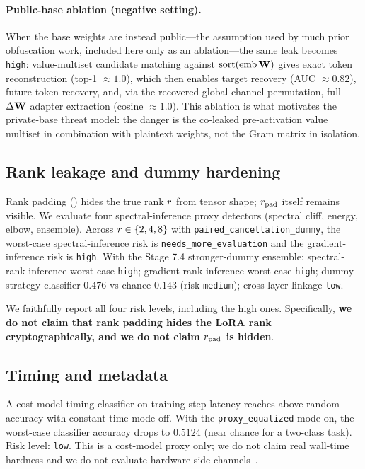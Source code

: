 \paragraph{Public-base ablation (negative setting).}
When the base weights are instead public---the assumption used by much prior obfuscation work, included here only as an ablation---the same leak becomes \texttt{high}: value-multiset candidate matching against $\mathrm{sort}(\mathrm{emb}\,\mathbf{W})$ gives exact token reconstruction (top-1 $\approx 1.0$), which then enables target recovery (AUC $\approx 0.82$), future-token recovery, and, via the recovered global channel permutation, full $\Delta\mathbf{W}$ adapter extraction (cosine $\approx 1.0$). This ablation is what motivates the private-base threat model: the danger is the co-leaked pre-activation value multiset in combination with plaintext weights, not the Gram matrix in isolation.

\subsection{Rank leakage and dummy hardening}
\label{sec:security:rank}
Rank padding () hides the true rank $r$ from tensor shape; $r_{\mathrm{pad}}$ itself remains visible. We evaluate four spectral-inference proxy detectors (spectral cliff, energy, elbow, ensemble). Across $r \in \{2, 4, 8\}$ with \texttt{paired\_cancellation\_dummy}, the worst-case spectral-inference risk is \texttt{needs\_more\_evaluation} and the gradient-inference risk is \texttt{high}. With the Stage 7.4 stronger-dummy ensemble: spectral-rank-inference worst-case \texttt{high}; gradient-rank-inference worst-case \texttt{high}; dummy-strategy classifier $0.476$ vs chance $0.143$ (risk \texttt{medium}); cross-layer linkage \texttt{low}.

We faithfully report all four risk levels, including the high ones. Specifically, \textbf{we do not claim that rank padding hides the LoRA rank cryptographically, and we do not claim $r_{\mathrm{pad}}$ is hidden}.

\subsection{Timing and metadata}
\label{sec:security:timing}
A cost-model timing classifier on training-step latency reaches above-random accuracy with constant-time mode off. With the \texttt{proxy\_equalized} mode on, the worst-case classifier accuracy drops to $0.5124$ (near chance for a two-class task). Risk level: \texttt{low}. This is a cost-model proxy only; we do not claim real wall-time hardness and we do not evaluate hardware side-channels~\cite{kocher2019spectre, vanbulck2018foreshadow}.

